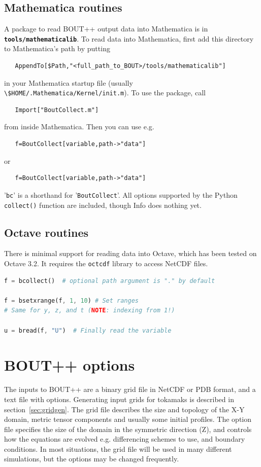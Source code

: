 \documentclass[12pt]{article}
\newcommand{\file}[1]{\texttt{\bf #1}}
\begin{document}
\subsection{Mathematica routines}

A package to read BOUT++ output data into Mathematica is in \file{tools/mathematicalib}. 
To read data into Mathematica, first add this directory to Mathematica's path by putting
\begin{verbatim}
   AppendTo[$Path,"<full_path_to_BOUT>/tools/mathematicalib"]
\end{verbatim}
in your Mathematica startup file (usually \lstinline!\$HOME/.Mathematica/Kernel/init.m!). To use
the package, call
\begin{verbatim}
   Import["BoutCollect.m"]
\end{verbatim}
from inside Mathematica. Then you can use e.g.
\begin{verbatim}
   f=BoutCollect[variable,path->"data"]
\end{verbatim}
or
\begin{verbatim}
   f=BoutCollect[variable,path->"data"]
\end{verbatim}
'\lstinline!bc!' is a shorthand for '\lstinline!BoutCollect!'. All options supported by the Python \lstinline!collect()!
function are included, though Info does nothing yet.

\subsection{Octave routines}

There is minimal support for reading data into Octave, which has been tested on
Octave 3.2. It requires the \texttt{octcdf} library to access NetCDF files.

\begin{lstlisting}[language=octave,numbers=none]
f = bcollect()  # optional path argument is "." by default

f = bsetxrange(f, 1, 10) # Set ranges
# Same for y, z, and t (NOTE: indexing from 1!)

u = bread(f, "U")  # Finally read the variable
\end{lstlisting}

\section{BOUT++ options}
\label{sec:options}

The inputs to BOUT++ are a binary grid file in NetCDF or PDB format,
and a text file with options. Generating input grids for tokamaks is
described in section~\ref{sec:gridgen}. The grid file describes the size
and topology of the X-Y domain, metric tensor components and usually
some initial profiles. The option file specifies the size of the domain
in the symmetric direction (Z), and controls how the equations are evolved
e.g. differencing schemes to use, and boundary conditions.
In most situations, the grid file will be used in many different simulations,
but the options may be changed frequently. 
\end{document}
